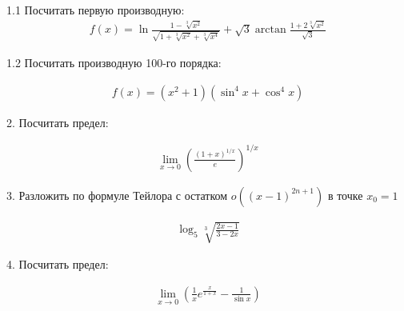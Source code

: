 \documentclass[a4paper]{report}
\begin{document}
1.1 Посчитать первую производную:
\begin{align*}
f(x) = \ln \frac{1-\sqrt[3]{x^2}}{\sqrt{1 + \sqrt[3]{x^2} + \sqrt[3]{x^4}}} + \sqrt{3} \arctan \frac{1 + 2\sqrt[3]{x^2}}{\sqrt{3}}
\end{align*}

1.2 Посчитать производную 100-го порядка:

\begin{align*}
f(x) = (x^2 + 1)(\sin^4 x + \cos^4 x)
\end{align*}

2. Посчитать предел:

\begin{align*}
\lim\limits_{x \to 0} \left(\frac{(1+x)^{1/x}}{e}\right)^{1/x}
\end{align*}

3. Разложить по формуле Тейлора с остатком $o((x-1)^{2n+1})$ в точке $x_0 = 1$

\begin{align*}
\log_5 \sqrt[3]{\frac{2x - 1}{3 - 2x}}
\end{align*}

4. Посчитать предел:

\begin{align*}
\lim\limits_{x \to 0}\left(\frac{1}{x}e^{\frac{x}{1+x}} - \frac{1}{\sin x}\right)
\end{align*}
\end{document}
